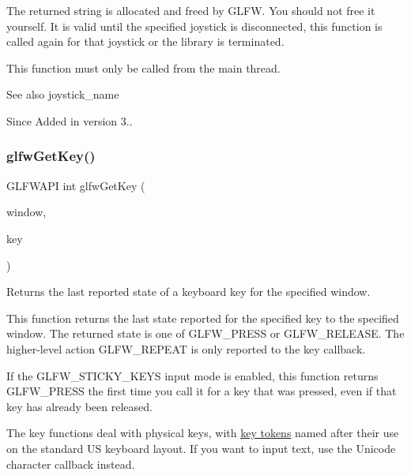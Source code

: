 The returned string is allocated and freed by G\+L\+FW. You should not free it yourself. It is valid until the specified joystick is disconnected, this function is called again for that joystick or the library is terminated.

This function must only be called from the main thread.

\begin{DoxySeeAlso}{See also}
joystick\+\_\+name
\end{DoxySeeAlso}
\begin{DoxySince}{Since}
Added in version 3.. 
\end{DoxySince}
\mbox{\label{group__input_ga7d8ad8ffaf272808f04e1d5d33ec8859}} 
\subsubsection{\texorpdfstring{glfw\+Get\+Key()}{glfwGetKey()}}
{\footnotesize\ttfamily G\+L\+F\+W\+A\+PI int glfw\+Get\+Key (\begin{DoxyParamCaption}\item[{\hyperlink{group__window_ga3c96d80d363e67d13a41b5d1821f3242}{G\+L\+F\+Wwindow} $\ast$}]{window,  }\item[{int}]{key }\end{DoxyParamCaption})}



Returns the last reported state of a keyboard key for the specified window. 

This function returns the last state reported for the specified key to the specified window. The returned state is one of {\ttfamily G\+L\+F\+W\+\_\+\+P\+R\+E\+SS} or {\ttfamily G\+L\+F\+W\+\_\+\+R\+E\+L\+E\+A\+SE}. The higher-\/level action {\ttfamily G\+L\+F\+W\+\_\+\+R\+E\+P\+E\+AT} is only reported to the key callback.

If the {\ttfamily G\+L\+F\+W\+\_\+\+S\+T\+I\+C\+K\+Y\+\_\+\+K\+E\+YS} input mode is enabled, this function returns {\ttfamily G\+L\+F\+W\+\_\+\+P\+R\+E\+SS} the first time you call it for a key that was pressed, even if that key has already been released.

The key functions deal with physical keys, with \hyperlink{group__keys}{key tokens} named after their use on the standard US keyboard layout. If you want to input text, use the Unicode character callback instead.

